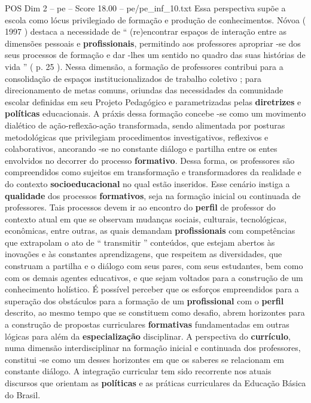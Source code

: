\begin{textsample}{POS Dim 2 – pe – Score 18.00 – pe/pe\_inf\_10.txt}
Essa perspectiva supõe a escola como lócus privilegiado de formação e produção de conhecimentos.
Nóvoa ( 1997 ) destaca a necessidade de “ (re)encontrar espaços de interação entre as dimensões pessoais e \textbf{profissionais}, permitindo aos professores apropriar -se dos seus processos de formação e dar -lhes um sentido no quadro das suas histórias de vida ” ( p. 25 ).
Nessa dimensão, a formação de professores contribui para a consolidação de espaços institucionalizados de trabalho coletivo ; para direcionamento de metas comuns, oriundas das necessidades da comunidade escolar definidas em seu Projeto Pedagógico e parametrizadas pelas \textbf{diretrizes} e \textbf{políticas} educacionais.
A práxis dessa formação concebe -se como um movimento dialético de ação-reflexão-ação transformada, sendo alimentada por posturas metodológicas que privilegiam procedimentos investigativos, reflexivos e colaborativos, ancorando -se no constante diálogo e partilha entre os entes envolvidos no decorrer do processo \textbf{formativo}.
Dessa forma, os professores são compreendidos como sujeitos em transformação e transformadores da realidade e do contexto \textbf{socioeducacional} no qual estão inseridos.
Esse cenário instiga a \textbf{qualidade} dos processos \textbf{formativos}, seja na formação inicial ou continuada de professores.
Tais processos devem ir ao encontro do \textbf{perfil} de professor do contexto atual em que se observam mudanças sociais, culturais, tecnológicas, econômicas, entre outras, as quais demandam \textbf{profissionais} com competências que extrapolam o ato de “ transmitir ” conteúdos, que estejam abertos às inovações e às constantes aprendizagens, que respeitem as diversidades, que construam a partilha e o diálogo com seus pares, com seus estudantes, bem como com os demais agentes educativos, e que sejam voltados para a construção de um conhecimento holístico.
É possível perceber que os esforços empreendidos para a superação dos obstáculos para a formação de um \textbf{profissional} com o \textbf{perfil} descrito, ao mesmo tempo que se constituem como desafio, abrem horizontes para a construção de propostas curriculares \textbf{formativas} fundamentadas em outras lógicas para além da \textbf{especialização} disciplinar.
A perspectiva do \textbf{currículo}, numa dimensão interdisciplinar na formação inicial e continuada dos professores, constitui -se como um desses horizontes em que os saberes se relacionam em constante diálogo.
A integração curricular tem sido recorrente nos atuais discursos que orientam as \textbf{políticas} e as práticas curriculares da Educação Básica do Brasil.

\end{textsample}
